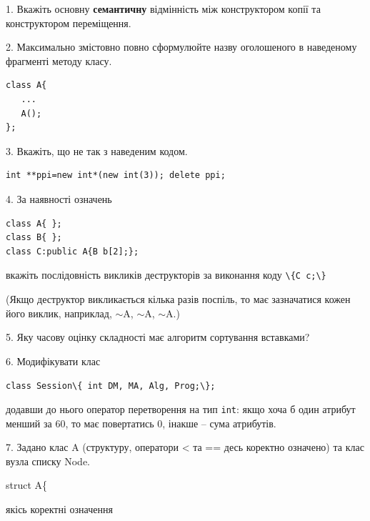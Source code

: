 \documentclass[12pt, ukrainian]{article}
\def\code#1{\Verb!#1!}
\begin{document}
{%
1. Вкажіть основну \textbf{семантичну} відмінність між конструктором копії та конструктором переміщення.%
\par
\vspace{2mm}
2. Максимально змістовно повно сформулюйте назву оголошеного в наведеному фрагменті методу класу.
\vspace{-3mm}
\begin{verbatim}class A{
   ...
   A();
};\end{verbatim}
\vspace{-3mm}
\par
\vspace{2mm}
3. Вкажіть, що не так з наведеним кодом.
\vspace{-3mm}
\begin{verbatim}int **ppi=new int*(new int(3)); delete ppi;\end{verbatim}
\vspace{-3mm}
\par
\vspace{2mm}
4. За наявності означень
\vspace{-3mm}
\begin{verbatim}
class A{ };
class B{ };
class C:public A{B b[2];};\end{verbatim}
\vspace{-3mm}
вкажіть послідовність викликів деструкторів за виконання коду \code{\{C c;\}} 

(Якщо деструктор викликається кілька разів поспіль, то має зазначатися кожен його виклик, наприклад, $\sim$A, $\sim$A, $\sim$A.)

\vspace{2mm}
5. Яку часову оцінку складності має алгоритм сортування вставками?
\par
\vspace{2mm}
6. Модифікувати клас 

\qquad\code{class Session\{ int DM, MA, Alg, Prog;\};} 


додавши до нього оператор перетворення на тип \code{int}: якщо хоча б один атрибут менший за 60, то має повертатись 0, інакше -- сума атрибутів.%
\par
\vspace{2mm}
7. 
Задано клас A (структуру, оператори < та == десь коректно означено) та клас вузла списку Node.

struct A\{

\quad  якісь коректні означення 

}
\end{document}

